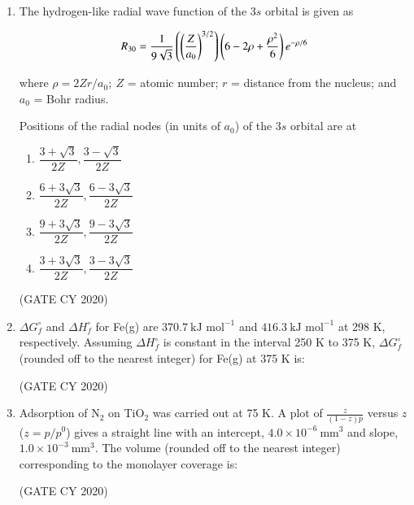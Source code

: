 \documentclass[12pt]{article}
\begin{document}
\begin{enumerate}
\item The hydrogen-like radial wave function of the $3s$ orbital is given as

\[
R_{30} = \frac{1}{9 \sqrt{3}} \left(\left(\frac{Z}{a_0}\right)^{3/2}\right) \left(6 - 2\rho + \frac{\rho^2}{6}\right) e^{-\rho/6}
\]


where $\rho = 2Zr/a_0;~ Z$ = atomic number; $r$ = distance from the nucleus; and $a_0$ = Bohr radius.

Positions of the radial nodes (in units of $a_0$) of the $3s$ orbital are at

\begin{enumerate}
\item $\dfrac{3+\sqrt{3}}{2Z}, \dfrac{3-\sqrt{3}}{2Z}$
\item $\dfrac{6+3\sqrt{3}}{2Z}, \dfrac{6-3\sqrt{3}}{2Z}$
\item $\dfrac{9+3\sqrt{3}}{2Z}, \dfrac{9-3\sqrt{3}}{2Z}$
\item $\dfrac{3+3\sqrt{3}}{2Z}, \dfrac{3-3\sqrt{3}}{2Z}$
\end{enumerate}
\hfill (GATE CY 2020)

\item $\Delta G_f^\circ$ and $\Delta H_f^\circ$ for Fe(g) are $370.7~\text{kJ mol}^{-1}$ and $416.3~\text{kJ mol}^{-1}$ at 298 K, respectively. Assuming $\Delta H_f^\circ$ is constant in the interval 250 K to 375 K, $\Delta G_f^\circ$ (rounded off to the nearest integer) for Fe(g) at 375 K is:

\begin{enumerate}
\end{enumerate}
\hfill (GATE CY 2020)

\item Adsorption of N$_2$ on TiO$_2$ was carried out at 75 K. A plot of $\frac{z}{(1-z)p}$ versus $z$ ($z = p/p^0$) gives a straight line with an intercept, $4.0 \times 10^{-6}~\text{mm}^3$ and slope, $1.0 \times 10^{-3}~\text{mm}^3$. The volume (rounded off to the nearest integer) corresponding to the monolayer coverage is:

\begin{enumerate}
\end{enumerate}
\hfill (GATE CY 2020)


\end{enumerate}
\end{document}
